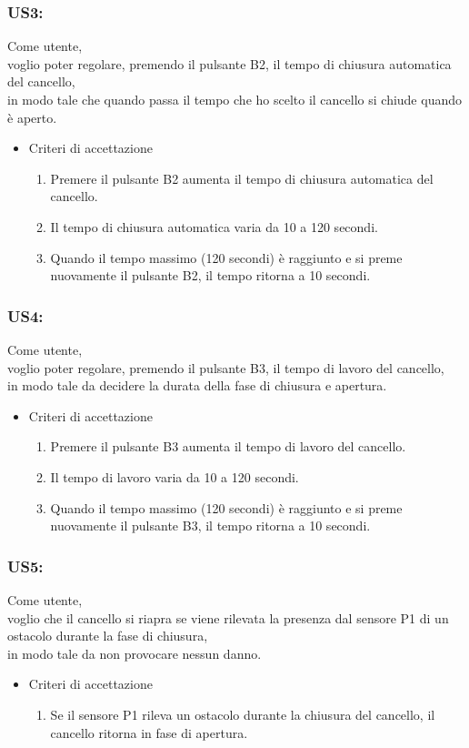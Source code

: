 \documentclass[12pt]{article}
\begin{document}
\subsubsection{US3:}
Come utente, \\
voglio poter regolare, premendo il pulsante B2, il tempo di chiusura automatica del cancello,\\
in modo tale che quando passa il tempo che ho scelto il cancello si chiude quando è aperto.
\begin{itemize}
    \item Criteri di accettazione
    \begin{enumerate}
        \item Premere il pulsante B2 aumenta il tempo di chiusura automatica del cancello.
        \item Il tempo di chiusura automatica varia da 10 a 120 secondi.
        \item Quando il tempo massimo (120 secondi) è raggiunto e si preme nuovamente il pulsante B2, il tempo ritorna a 10 secondi.
    \end{enumerate}
\end{itemize}
\subsubsection{US4:}
Come utente, \\
voglio poter regolare, premendo il pulsante B3, il tempo di lavoro del cancello,\\
in modo tale da decidere la durata della fase di chiusura e apertura.
\begin{itemize}
    \item Criteri di accettazione
    \begin{enumerate}
        \item Premere il pulsante B3 aumenta il tempo di lavoro del cancello.
        \item Il tempo di lavoro varia da 10 a 120 secondi.
        \item Quando il tempo massimo (120 secondi) è raggiunto e si preme nuovamente il pulsante B3, il tempo ritorna a 10 secondi.
    \end{enumerate}
\end{itemize}
\subsubsection{US5:}
Come utente, \\
voglio che il cancello si riapra se viene rilevata la presenza dal sensore P1 di un ostacolo durante la fase di chiusura,\\
in modo tale da non provocare nessun danno.
\begin{itemize}
    \item Criteri di accettazione
    \begin{enumerate}
        \item Se il sensore P1 rileva un ostacolo durante la chiusura del cancello, il cancello ritorna in fase di apertura.
    \end{enumerate}
\end{itemize}
\end{document}
